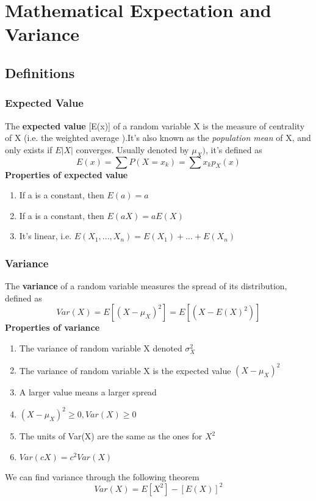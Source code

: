 \documentclass{article}
\begin{document}
\section{Mathematical Expectation and Variance}
\subsection{Definitions}
\subsubsection{Expected Value}
The \textbf{expected value} [E(x)] of a random variable X is the measure of centrality of X (i.e. the weighted average ).It's also known as the \textit{population mean} of X, and only exists if $E|X|$ converges. Usually denoted by $\mu_X)$, it's defined as 
\[E(x)=\sum P(X=x_k) = \sum x_kp_X(x)\]
\textbf{Properties of expected value}
\begin{enumerate}
    \item If a is a constant, then $E(a) =  a$
    \item If a is a constant, then $E(aX)=aE(X)$
    \item It's linear, i.e. $E(X_1,...,X_n)=E(X_1)+...+E(X_n)$
\end{enumerate}
\subsubsection{Variance}
The \textbf{variance} of a random variable measures the spread of its distribution, defined as 
\[Var(X)=E[(X-\mu_X)^2]= E[(X-E(X)^2)]\]
\textbf{Properties of variance}
\begin{enumerate}
    \item The variance of random variable X denoted $\sigma^2_X$
    \item The variance of random variable X is the expected value $(X-\mu_X)^2$
    \item A larger value means a larger spread
    \item $(X-\mu_X)^2\geq 0, Var (X)\geq 0$
    \item The units of Var(X) are the same as the ones for $X^2$
    \item $Var(cX) = c^2Var(X)$
\end{enumerate}
We can find variance through the following theorem
\[Var(X)=E[X^2]-[E(X)]^2\]
\end{document}
